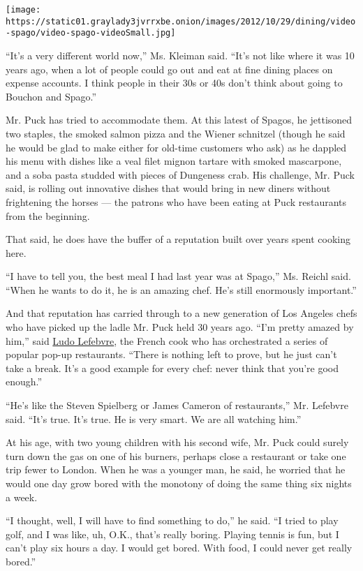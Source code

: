 \texttt{[image: https://static01.graylady3jvrrxbe.onion/images/2012/10/29/dining/video-spago/video-spago-videoSmall.jpg]}

``It's a very different world now,'' Ms. Kleiman said. ``It's not like
where it was 10 years ago, when a lot of people could go out and eat at
fine dining places on expense accounts. I think people in their 30s or
40s don't think about going to Bouchon and Spago.''

Mr. Puck has tried to accommodate them. At this latest of Spagos, he
jettisoned two staples, the smoked salmon pizza and the Wiener schnitzel
(though he said he would be glad to make either for old-time customers
who ask) as he dappled his menu with dishes like a veal filet mignon
tartare with smoked mascarpone, and a soba pasta studded with pieces of
Dungeness crab. His challenge, Mr. Puck said, is rolling out innovative
dishes that would bring in new diners without frightening the horses ---
the patrons who have been eating at Puck restaurants from the beginning.

That said, he does have the buffer of a reputation built over years
spent cooking here.

``I have to tell you, the best meal I had last year was at Spago,'' Ms.
Reichl said. ``When he wants to do it, he is an amazing chef. He's still
enormously important.''

And that reputation has carried through to a new generation of Los
Angeles chefs who have picked up the ladle Mr. Puck held 30 years ago.
``I'm pretty amazed by him,'' said
\href{http://www.nytimes3xbfgragh.onion/2010/08/04/dining/04notebook.html?pagewanted=all}{Ludo
Lefebvre}, the French cook who has orchestrated a series of popular
pop-up restaurants. ``There is nothing left to prove, but he just can't
take a break. It's a good example for every chef: never think that
you're good enough.''

``He's like the Steven Spielberg or James Cameron of restaurants,'' Mr.
Lefebvre said. ``It's true. It's true. He is very smart. We are all
watching him.''

At his age, with two young children with his second wife, Mr. Puck could
surely turn down the gas on one of his burners, perhaps close a
restaurant or take one trip fewer to London. When he was a younger man,
he said, he worried that he would one day grow bored with the monotony
of doing the same thing six nights a week.

``I thought, well, I will have to find something to do,'' he said. ``I
tried to play golf, and I was like, uh, O.K., that's really boring.
Playing tennis is fun, but I can't play six hours a day. I would get
bored. With food, I could never get really bored.''

